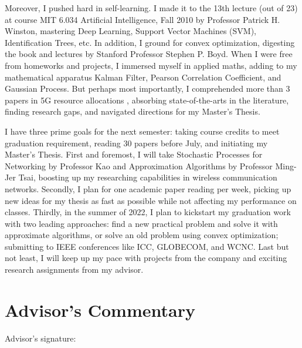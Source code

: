 \documentclass[12pt, a4paper, onside]{article}
\begin{document}
Moreover, I pushed hard in self-learning. I made it to the 13th lecture (out of 23) at course MIT 6.034 Artificial Intelligence, Fall 2010 by Professor Patrick H. Winston, mastering Deep Learning, Support Vector Machines (SVM), Identification Trees, etc. In addition, I ground for convex optimization, digesting the book and lectures by Stanford Professor Stephen P. Boyd. When I were free from homeworks and projects, I immersed myself in applied maths, adding to my mathematical apparatus Kalman Filter, Pearson Correlation Coefficient, and Gaussian Process. But perhaps most importantly, I comprehended more than 3 papers in 5G resource allocations \cite{5gJointThreshold, 5gJointACM, 5gQoS, 5gNoma}, absorbing state-of-the-arts in the literature, finding research gaps, and navigated directions for my Master's Thesis.

I have three prime goals for the next semester: taking course credits to meet graduation requirement, reading 30 papers before July, and initiating my Master's Thesis. First and foremost, I will take Stochastic Processes for Networking by Professor Kao and Approximation Algorithms by Professor Ming-Jer Tsai, boosting up my researching capabilities in wireless communication networks. Secondly, I plan for one academic paper reading per week, picking up new ideas for my thesis as fast as possible while not affecting my performance on classes. Thirdly, in the summer of 2022, I plan to kickstart my graduation work with two leading approaches: find a new practical problem and solve it with approximate algorithms, or solve an old problem using convex optimization; submitting to IEEE conferences like ICC, GLOBECOM, and WCNC. Last but not least, I will keep up my pace with projects from the company and exciting research assignments from my advisor.

\section{Advisor's Commentary}
Advisor's signature:

\printbibliography
\end{document}
